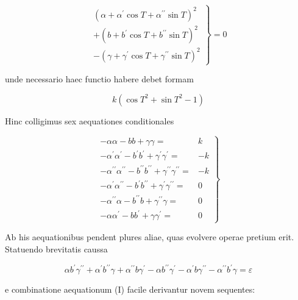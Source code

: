 \documentclass[10pt]{article}
\begin{document}
\[
\left.\begin{array}{r}
\left(\alpha+\alpha^{\prime} \cos T+\alpha^{\prime \prime} \sin T\right)^{2} \\
+\left(b+b^{\prime} \cos T+b^{\prime \prime} \sin T\right)^{2} \\
-\left(\gamma+\gamma^{\prime} \cos T+\gamma^{\prime \prime} \sin T\right)^{2}
\end{array}\right\}=0
\]

unde necessario haec functio habere debet formam

\[
k\left(\cos T^{2}+\sin T^{2}-1\right)
\]

Hinc colligimus sex aequationes conditionales

\[
\left.\begin{array}{lr}
-\alpha \alpha-b b+\gamma \gamma= & k \\
-\alpha^{\prime} \alpha^{\prime}-b^{\prime} b^{\prime}+\gamma^{\prime} \gamma^{\prime}= & -k \\
-\alpha^{\prime \prime} \alpha^{\prime \prime}-b^{\prime \prime} b^{\prime \prime}+\gamma^{\prime \prime} \gamma^{\prime \prime}= & -k \\
-\alpha^{\prime} \alpha^{\prime \prime}-b^{\prime} b^{\prime \prime}+\gamma^{\prime} \gamma^{\prime \prime}= & 0 \\
-\alpha^{\prime \prime} \alpha-b^{\prime \prime} b+\gamma^{\prime \prime} \gamma= & 0 \\
-\alpha \alpha^{\prime}-b b^{\prime}+\gamma \gamma^{\prime}= & 0
\end{array}\right\}
\]

\(\mathrm{Ab}\) his aequationibus pendent plures aliae, quas evolvere operae pretium erit. Statuendo brevitatis caussa

\[
\alpha b^{\prime} \gamma^{\prime \prime}+\alpha^{\prime} b^{\prime \prime} \gamma+\alpha^{\prime \prime} b \gamma^{\prime}-\alpha b^{\prime \prime} \gamma^{\prime}-\alpha^{\prime} b \gamma^{\prime \prime}-\alpha^{\prime \prime} b^{\prime} \gamma=\varepsilon
\]

e combinatione aequationum (I) facile derivantur novem sequentes:
\end{document}
